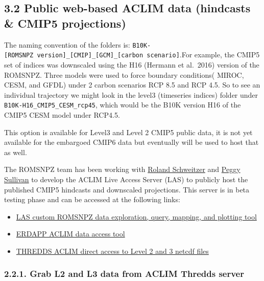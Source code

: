 \documentclass[
]{article}
\begin{document}
\hypertarget{public-web-based-aclim-data-hindcasts-cmip5-projections}{%
\subsection{3.2 Public web-based ACLIM data (hindcasts \& CMIP5
projections)}\label{public-web-based-aclim-data-hindcasts-cmip5-projections}}

The naming convention of the folders is:
\texttt{B10K-{[}ROMSNPZ\ version{]}\_{[}CMIP{]}\_{[}GCM{]}\_{[}carbon\ scenario{]}}.For
example, the CMIP5 set of indices was downscaled using the H16 (Hermann
et al.~2016) version of the ROMSNPZ. Three models were used to force
boundary conditions( MIROC, CESM, and GFDL) under 2 carbon scenarios RCP
8.5 and RCP 4.5. So to see an individual trajectory we might look in the
level3 (timeseries indices) folder under
\texttt{B10K-H16\_CMIP5\_CESM\_rcp45}, which would be the B10K version
H16 of the CMIP5 CESM model under RCP4.5.

This option is available for Level3 and Level 2 CMIP5 public data, it is
not yet available for the embargoed CMIP6 data but eventually will be
used to host that as well.

The ROMSNPZ team has been working with
\href{roland.schweitzer@noaa.gov}{Roland Schweitzer} and
\href{peggy.sullivan@noaa.gov}{Peggy Sullivan} to develop the ACLIM Live
Access Server (LAS) to publicly host the published CMIP5 hindcasts and
downscaled projections. This server is in beta testing phase and can be
accessed at the following links:

\begin{itemize}
\item
  \href{https://data.pmel.noaa.gov/aclim/las/}{LAS custom ROMSNPZ data
  exploration, query, mapping, and plotting tool}
\item
  \href{https://data.pmel.noaa.gov/aclim/erddap/}{ERDAPP ACLIM data
  access tool}
\item
  \href{https://data.pmel.noaa.gov/aclim/thredds/}{THREDDS ACLIM direct
  access to Level 2 and 3 netcdf files}
\end{itemize}

\hypertarget{grab-l2-and-l3-data-from-aclim-thredds-server}{%
\subsubsection{2.2.1. Grab L2 and L3 data from ACLIM Thredds
server}\label{grab-l2-and-l3-data-from-aclim-thredds-server}}
\end{document}
